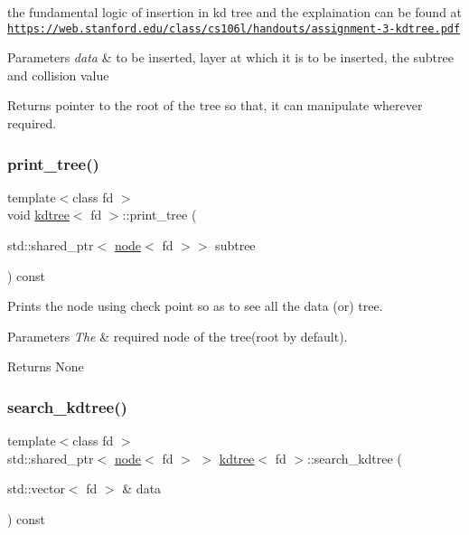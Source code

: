 the fundamental logic of insertion in kd tree and the explaination can be found at \href{https://web.stanford.edu/class/cs106l/handouts/assignment-3-kdtree.pdf}{\tt https\+://web.\+stanford.\+edu/class/cs106l/handouts/assignment-\/3-\/kdtree.\+pdf} 


\begin{DoxyParams}{Parameters}
{\em data} & to be inserted, layer at which it is to be inserted, the subtree and collision value \\
\hline
\end{DoxyParams}
\begin{DoxyReturn}{Returns}
pointer to the root of the tree so that, it can manipulate wherever required. 
\end{DoxyReturn}
\mbox{\label{classkdtree_a21c911f32cabf57ea36f5e8083d53532}} 
\subsubsection{\texorpdfstring{print\+\_\+tree()}{print\_tree()}}
{\footnotesize\ttfamily template$<$class fd $>$ \\
void \hyperlink{classkdtree}{kdtree}$<$ fd $>$\+::print\+\_\+tree (\begin{DoxyParamCaption}\item[{std\+::shared\+\_\+ptr$<$ \hyperlink{classnode}{node}$<$ fd $>$$>$}]{subtree }\end{DoxyParamCaption}) const}



Prints the node using check point so as to see all the data (or) tree. 


\begin{DoxyParams}{Parameters}
{\em The} & required node of the tree(root by default). \\
\hline
\end{DoxyParams}
\begin{DoxyReturn}{Returns}
None 
\end{DoxyReturn}
\mbox{\label{classkdtree_a82969cfee401ee863d03ad6ff7488598}} 
\subsubsection{\texorpdfstring{search\+\_\+kdtree()}{search\_kdtree()}\hspace{0.1cm}{\footnotesize\ttfamily [1/2]}}
{\footnotesize\ttfamily template$<$class fd $>$ \\
std\+::shared\+\_\+ptr$<$ \hyperlink{classnode}{node}$<$ fd $>$ $>$ \hyperlink{classkdtree}{kdtree}$<$ fd $>$\+::search\+\_\+kdtree (\begin{DoxyParamCaption}\item[{std\+::vector$<$ fd $>$ \&}]{data }\end{DoxyParamCaption}) const}



